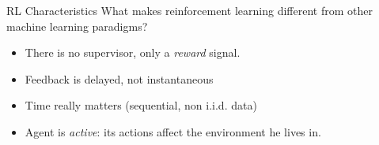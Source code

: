 \bgroup
\begin{frame}{RL Characteristics}
What makes reinforcement learning different from other machine learning paradigms?
\begin{itemize}
\item There is no supervisor, only a \emph{reward} signal.
\item Feedback is delayed, not instantaneous
\item Time really matters (sequential, non i.i.d. data)
\item Agent is \emph{active}: its actions affect the environment he lives in.
\end{itemize}
\end{frame}
\egroup